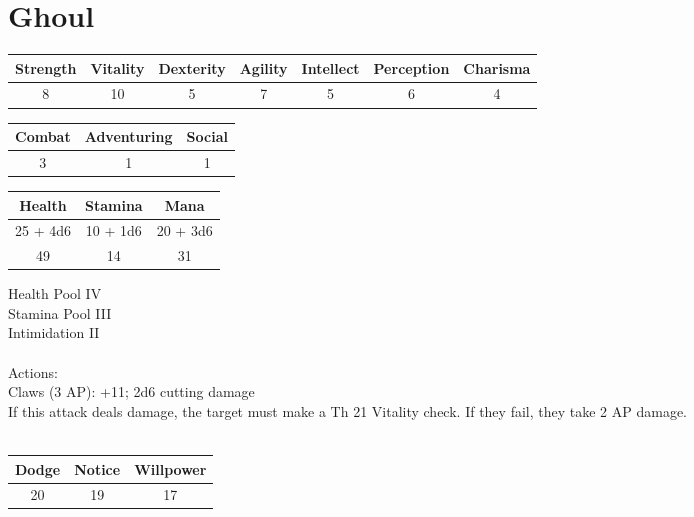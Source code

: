 \section{Ghoul}
\begin{minipage}[H]{1\textwidth}
    \centering
    \begin{tabular}[c]{|c | c | c | c | c | c | c|}
        \hline
        Strength & Vitality & Dexterity & Agility & Intellect & Perception & Charisma\\
        \hline
        8 & 10 & 5 & 7 & 5 & 6 & 4\\
        \hline
    \end{tabular}
\end{minipage}
\begin{minipage}[H]{1\textwidth}
    \centering
    \begin{tabular}[c]{|c | c | c|}
        \hline
        Combat & Adventuring & Social\\
        \hline
        3 & 1 & 1\\
        \hline
    \end{tabular}
\end{minipage}
\begin{minipage}[H]{1\textwidth}
    \centering
    \begin{tabular}[c]{|c | c | c|}
        \hline
        Health & Stamina & Mana\\
        \hline
        25 + 4d6 & 10 + 1d6 & 20 + 3d6\\
        49 & 14 & 31\\
        \hline
    \end{tabular}
\end{minipage}
Health Pool IV\\
Stamina Pool III\\
Intimidation II\\
\\
Actions:\\
Claws (3 AP): +11; 2d6 cutting damage\\
If this attack deals damage, the target must make a Th 21 Vitality check.
If they fail, they take 2 AP damage.\\
\\
\begin{minipage}[H]{1\textwidth}
    \centering
    \begin{tabular}[c]{|c | c | c|}
        \hline
        Dodge & Notice & Willpower\\
        \hline
        20 & 19 & 17\\
        \hline
    \end{tabular}
\end{minipage}
